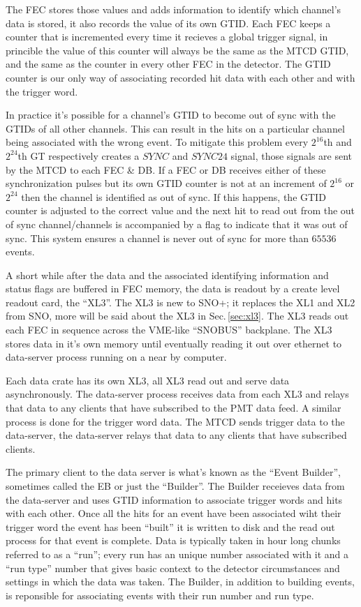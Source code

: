 The FEC stores those values and adds information to identify which
channel's data is stored, it also records the value of its own GTID\@.
Each FEC keeps a counter that is incremented every time it recieves a global
trigger signal, in princible the value of this counter will always be the same
as the MTCD GTID, and the same as the counter in every other FEC in the detector.
The GTID counter is our only way of associating recorded hit data with each other
and with the trigger word.

In practice it's possible for a channel's GTID to become out of sync with the GTIDs of
all other channels.
This can result in the hits on a particular channel being associated with
the wrong event.
To mitigate this problem every $2^{16}$th and $2^{24}$th GT respectively creates a $SYNC$ and
$SYNC24$ signal, those signals are sent by the MTCD to each FEC \& DB\@.
If a FEC or DB receives either of these synchronization pulses but its own GTID counter is not
at an increment of $2^{16}$ or $2^{24}$ then the channel is identified as out of sync.
If this happens, the GTID counter is adjusted to the correct value and the next hit to read out from the out of sync channel/channels is accompanied
by a flag to indicate that it was out of sync.
This system ensures a channel is never out of sync for more than $65536$ events.

A short while after the data and the associated identifying information and status flags are buffered
in FEC memory, the data is readout by a create level readout card,
the ``XL3''.
The XL3 is new to SNO+; it replaces the XL1 and XL2 from SNO, more will be said about the
XL3 in Sec.\,\ref{sec:xl3}.
The XL3 reads out each FEC in sequence across the VME-like ``SNOBUS'' backplane.
The XL3 stores data in it's own memory until eventually reading it out over
ethernet to data-server process running on a near by computer.

Each data crate has its own XL3, all XL3 read out and serve data asynchronously.
The data-server process receives data from each XL3 and relays that data to
any clients that have subscribed to the PMT data feed.
A similar process is done for the trigger word data. The MTCD sends trigger data
to the data-server, the data-server relays that data to any clients that have subscribed
clients.

The primary client to the data server is what's known as the ``Event Builder'', sometimes
called the EB or just the ``Builder''. The Builder receieves data from the data-server and
uses GTID information to associate trigger words and hits with each other.
Once all the hits for an event have been associated wiht their trigger word the event
has been ``built'' it is written to disk and the read out process for that event is complete.
Data is typically taken in hour long chunks referred to as a ``run'';
every run has an unique number associated with it and a ``run type'' number that
gives basic context to the detector circumstances and settings in which the data was taken.
The Builder, in addition to building events, is reponsible for associating
events with their run number and run type.

